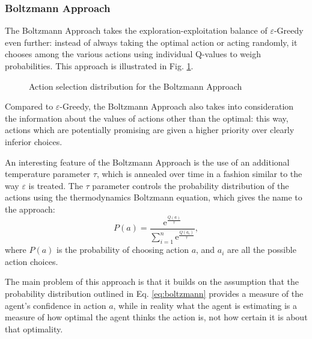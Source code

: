 \documentclass[a4paper, 12pt]{article}
\numberwithin{equation}{section}
\begin{document}
\subsubsection{Boltzmann Approach}

The Boltzmann Approach takes the exploration-exploitation balance of $\varepsilon$-Greedy even further: instead of always taking the optimal action or acting randomly, it chooses among the various actions using individual Q-values to weigh probabilities. This approach is illustrated in Fig. \ref{fig:boltzmann}.


\begin{figure}[h]
	\centering
		\caption{Action selection distribution for the Boltzmann Approach}
	\label{fig:boltzmann}
\end{figure}

Compared to $\varepsilon$-Greedy, the Boltzmann Approach also takes into consideration the information about the values of actions other than the optimal: this way, actions which are potentially promising are given a higher priority over clearly inferior choices.

An interesting feature of the Boltzmann Approach is the use of an additional temperature parameter $\tau$, which is annealed over time in a fashion similar to the way $\varepsilon$ is treated. The $\tau$ parameter controls the probability distribution of the actions using the thermodynamics Boltzmann equation, which gives the name to the approach:
\begin{equation}\label{eq:boltzmann}
	P\left(a\right) = \frac{\mathrm{e}^\frac{Q\left(a\right)}{\tau}}{\sum_{i=1}^n \mathrm{e}^\frac{Q\left(a_i\right)}{\tau}},
\end{equation}
where $P\left(a\right)$ is the probability of choosing action $a$, and $a_i$ are all the possible action choices.

The main problem of this approach is that it builds on the assumption that the probability distribution outlined in Eq. \eqref{eq:boltzmann} provides a measure of the agent's confidence in action $a$, while in reality what the agent is estimating is a measure of how optimal the agent thinks the action is, not how certain it is about that optimality.
\end{document}
